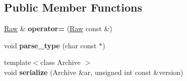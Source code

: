 \subsection*{\-Public \-Member \-Functions}
\begin{DoxyCompactItemize}
\item 
\hypertarget{classNeb_1_1Shape_1_1Raw_a074a67a01eef2f46e2776bfca6aa84e7}{\hyperlink{classNeb_1_1Shape_1_1Raw}{\-Raw} \& {\bfseries operator=} (\hyperlink{classNeb_1_1Shape_1_1Raw}{\-Raw} const \&)}\label{classNeb_1_1Shape_1_1Raw_a074a67a01eef2f46e2776bfca6aa84e7}

\item 
\hypertarget{classNeb_1_1Shape_1_1Raw_a15d804d51a80fe32247cac99d3878a2e}{void {\bfseries parse\-\_\-type} (char const $\ast$)}\label{classNeb_1_1Shape_1_1Raw_a15d804d51a80fe32247cac99d3878a2e}

\item 
\hypertarget{classNeb_1_1Shape_1_1Raw_a83218844b00475e2df413899b02f16eb}{{\footnotesize template$<$class Archive $>$ }\\void {\bfseries serialize} (\-Archive \&ar, unsigned int const \&version)}\label{classNeb_1_1Shape_1_1Raw_a83218844b00475e2df413899b02f16eb}

\end{DoxyCompactItemize}
